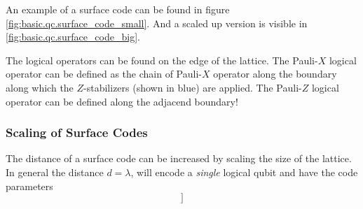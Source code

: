 An example of a surface code can be found in figure \ref{fig:basic.qc.surface_code_small}.
And a scaled up version is visible in \ref{fig:basic.qc.surface_code_big}.

The logical operators can be found on the edge of the lattice. 
The Pauli-$X$ logical operator can be defined as the chain of Pauli-$X$ operator along the boundary along which the $Z$-stabilizers (shown in blue) are applied.
The Pauli-$Z$ logical operator can be defined along the adjacend boundary!

\subsubsection{Scaling of Surface Codes}
The distance of a surface code can be increased by scaling the size of the lattice.
In general the distance $d=\lambda$, will encode a \textit{single} logical qubit and have the code parameters
\begin{equation}
    [[n = \lambda^2 + (\lambda-1)^2, k=1 ]]
\end{equation}
